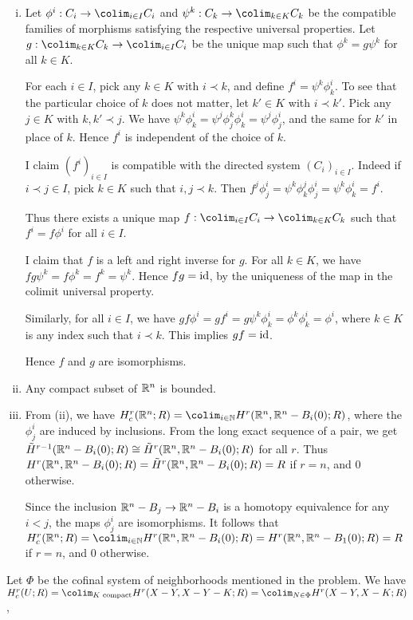 \documentclass{article}
\begin{document}
 \begin{enumerate}[i.]
\item Let $\phi^i: C_i \to \colim_{i \in I} C_i$ and $\psi^k: C_k \to \colim_{k \in K} C_k$ be the compatible families of morphisms satisfying the respective universal properties. Let $g: \colim_{k \in K} C_k \to \colim_{i \in I} C_i$ be the unique map such that $\phi^k = g \psi^k$ for all $k \in K$.

For each $i \in I$, pick any $k \in K$ with $i \prec k$, and define $f^i = \psi^{k} \phi^i_{k}$. To see that the particular choice of $k$ does not matter, let $k' \in K$ with $i \prec k'$. Pick any $j \in K$ with $k, k' \prec j$.  We have $\psi^{k} \phi^i_{k} = \psi^j \phi^k_j \phi^i_k = \psi^j \phi^i_j$, and the same for $k'$ in place of $k$. Hence $f^i$ is independent of the choice of $k$.

I claim $(f^i)_{i\in I}$ is compatible with the directed system $(C_i)_{i \in I}$. Indeed if $i \prec j \in I$, pick $k \in K$ such that $i,j \prec k$. Then  $f^j \phi^i_j = \psi^k \phi^j_k \phi^i_j = \psi^k \phi^i_k = f^i$.

Thus there exists a unique map $f: \colim_{i \in I} C_i \to \colim_{k \in K} C_k$ such that $f^i = f \phi^i$ for all $i \in I$.

I claim that $f$ is a left and right inverse for $g$.  For all $k \in K$, we have $fg \psi^k = f \phi^k = f^k = \psi^k$. Hence $fg = \operatorname{id}$, by the uniqueness of the map in the colimit universal property.  

Similarly, for all $i \in I$, we have $gf \phi^i = g f^i = g \psi^k \phi^i_k = \phi^k \phi^i_k = \phi^i$, where $k \in K$ is any index such that $i \prec k$. This implies $gf = \operatorname{id}$.  

Hence $f$ and $g$ are isomorphisms.

\item Any compact subset of $\mathbb{R}^n$ is bounded.

\item From (ii), we have $H^r_c(\R^n; R) = \colim_{i \in \N} H^r(\R^n, \R^n - B_i(0); R)$, where the $\phi^i_j$ are induced by inclusions. From the long exact sequence of a pair, we get $\tilde H^{r-1}(\mathbb{R}^n - B_i(0); R) \cong \tilde H^r(\mathbb{R}^n, \mathbb{R}^n - B_i(0); R)$ for all $r$.  Thus $H^r(\mathbb{R}^n, \mathbb{R}^n - B_i(0); R) = \tilde  H^r(\mathbb{R}^n, \mathbb{R}^n - B_i(0); R) = R$ if $r = n$, and $0$ otherwise.

Since the inclusion $\mathbb{R}^n - B_j \to \mathbb{R}^n - B_i$ is a homotopy equivalence for any $i < j$, the maps $\phi^i_j$ are isomorphisms. It follows that $H^r_c(\R^n; R) = \colim_{i \in \N} H^r(\R^n, \R^n - B_i(0); R) = H^r(\R^n, \R^n - B_1(0); R) = R$ if $r = n$, and $0$ otherwise.
\end{enumerate}

 Let $\Phi$ be the cofinal system of neighborhoods mentioned in the problem. 
We have $H^r_c(U; R) = \colim_{K \text{ compact}} H^r(X - Y, X - Y - K; R) = \colim_{N \in \Phi} H^r(X - Y, X - K; R) $, 
\end{document}
